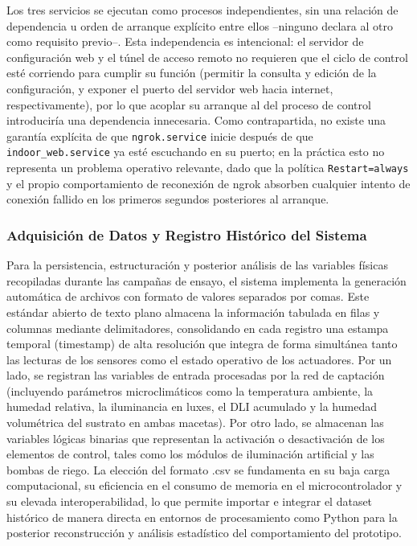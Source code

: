 Los tres servicios se ejecutan como procesos independientes, sin una relación de dependencia u orden de arranque explícito entre ellos --ninguno declara al otro como requisito previo--. Esta independencia es intencional: el servidor de configuración web y el túnel de acceso remoto no requieren que el ciclo de control esté corriendo para cumplir su función (permitir la consulta y edición de la configuración, y exponer el puerto del servidor web hacia internet, respectivamente), por lo que acoplar su arranque al del proceso de control introduciría una dependencia innecesaria. Como contrapartida, no existe una garantía explícita de que \texttt{ngrok.service} inicie después de que \texttt{indoor\_web.service} ya esté escuchando en su puerto; en la práctica esto no representa un problema operativo relevante, dado que la política \texttt{Restart=always} y el propio comportamiento de reconexión de ngrok absorben cualquier intento de conexión fallido en los primeros segundos posteriores al arranque.
\subsubsection{Adquisición de Datos y Registro Histórico del Sistema}
\label{subsubsec:adquisicion_registro}

Para la persistencia, estructuración y posterior análisis de las variables físicas recopiladas durante las campañas de ensayo, el sistema implementa la generación automática de archivos con formato de valores separados por comas. Este estándar abierto de texto plano almacena la información tabulada en filas y columnas mediante delimitadores, consolidando en cada registro una estampa temporal (timestamp) de alta resolución que integra de forma simultánea tanto las lecturas de los sensores como el estado operativo de los actuadores. Por un lado, se registran las variables de entrada procesadas por la red de captación (incluyendo parámetros microclimáticos como la temperatura ambiente, la humedad relativa, la iluminancia en luxes, el DLI acumulado y la humedad volumétrica del sustrato en ambas macetas). Por otro lado, se almacenan las variables lógicas binarias que representan la activación o desactivación de los elementos de control, tales como los módulos de iluminación artificial y las bombas de riego. La elección del formato .csv se fundamenta en su baja carga computacional, su eficiencia en el consumo de memoria en el microcontrolador y su elevada interoperabilidad, lo que permite importar e integrar el dataset histórico de manera directa en entornos de procesamiento como Python para la posterior reconstrucción y análisis estadístico del comportamiento del prototipo.

